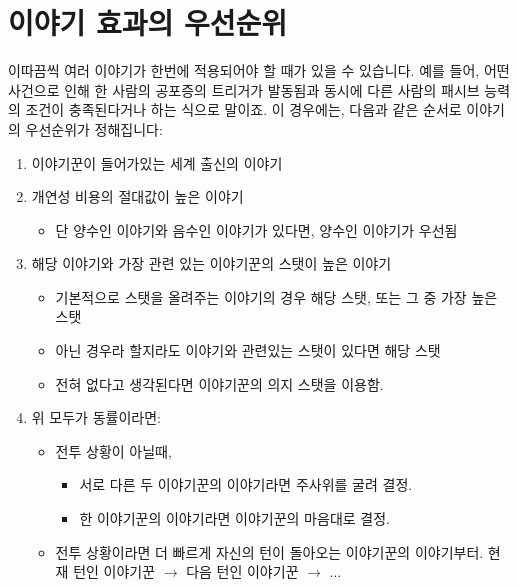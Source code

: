 \documentclass{report}
\begin{document}
	\section*{이야기 효과의 우선순위}
	이따끔씩 여러 이야기가 한번에 적용되어야 할 때가 있을 수 있습니다. 예를 들어, 어떤 사건으로 인해 한 사람의 공포증의 트리거가 발동됨과 동시에 다른 사람의 패시브 능력의 조건이 충족된다거나 하는 식으로 말이죠. 이 경우에는, 다음과 같은 순서로 이야기의 우선순위가 정해집니다:
	\begin{enumerate}
		\item 이야기꾼이 들어가있는 세계 출신의 이야기
		\item 개연성 비용의 절대값이 높은 이야기
		\begin{itemize}
			\item 단 양수인 이야기와 음수인 이야기가 있다면, 양수인 이야기가 우선됨
		\end{itemize}
		\item 해당 이야기와 가장 관련 있는 이야기꾼의 스탯이 높은 이야기
		\begin{itemize}
			\item 기본적으로 스탯을 올려주는 이야기의 경우 해당 스탯, 또는 그 중 가장 높은 스탯
			\item 아닌 경우라 할지라도 이야기와 관련있는 스탯이 있다면 해당 스탯
			\item 전혀 없다고 생각된다면 이야기꾼의 의지 스탯을 이용함.
		\end{itemize}
		\item 위 모두가 동률이라면:
		\begin{itemize}
			\item 전투 상황이 아닐때, 
			\begin{itemize}
				\item 서로 다른 두 이야기꾼의 이야기라면 주사위를 굴려 결정.
				\item 한 이야기꾼의 이야기라면 이야기꾼의 마음대로 결정.
			\end{itemize}
			\item 전투 상황이라면 더 빠르게 자신의 턴이 돌아오는 이야기꾼의 이야기부터.
			\subitem 현재 턴인 이야기꾼 $\rightarrow$ 다음 턴인 이야기꾼 $\rightarrow$ ...
		\end{itemize}
	\end{enumerate}
	
	
\end{document}
